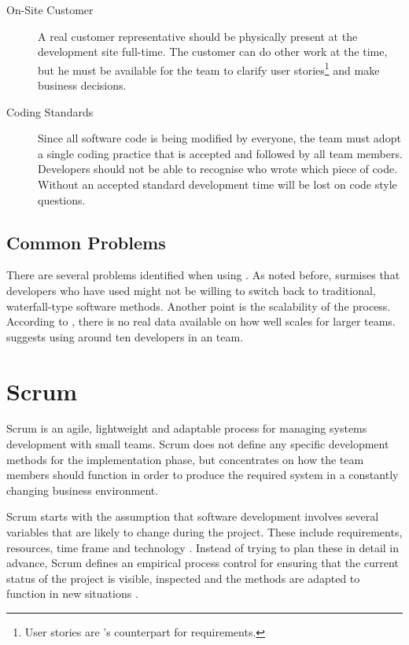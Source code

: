 \begin{description}
\item[On-Site Customer] A real customer representative should be 
physically present at the development site full-time. The customer can 
do other work at the time, but he must be available for the team to 
clarify user stories\footnote{User stories are 's 
counterpart for requirements.} and make business decisions.

\item[Coding Standards] Since all software code is being modified by 
everyone, the team must adopt a single coding practice that is 
accepted and followed by all team members. Developers should not be 
able to recognise who wrote which piece of code. Without an accepted 
standard development time will be lost on code style questions.
\end{description}


\subsection{Common Problems}
\label{toc:agile:xp:problems}

There are several problems identified when using . As noted
before, \cite{questioningxp} surmises that developers who have used
 might not be willing to switch back to traditional,
waterfall-type software methods. Another point is the scalability of
the process. According to \cite{rapidxp}, there is no real data
available on how well  scales for larger teams.
\cite{xpexplained} suggests using around ten developers in an
 team.


\section{Scrum}
\label{toc:agile:scrum}

Scrum is an agile, lightweight and adaptable process for managing 
systems development with small teams. Scrum does not define any 
specific development methods for the implementation phase, but 
concentrates on how the team members should function in order to 
produce the required system in a constantly changing business 
environment. \citep{scrum,agilesdm}

Scrum starts with the assumption that software development involves 
several variables that are likely to change during the project. These 
include requirements, resources, time frame and technology 
\citep{agilesdm}. Instead of trying to plan these in detail in 
advance, Scrum defines an empirical process control for ensuring that 
the current status of the project is visible, inspected and the 
methods are adapted to function in new situations 
\citep{agilescrum}.

